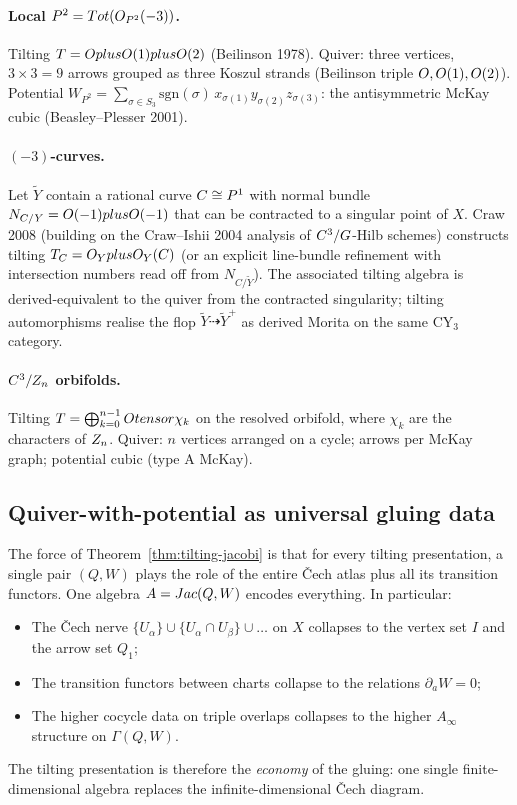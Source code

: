 \paragraph{Local $P^2 = Tot(O_{P^2}(-3))$.} Tilting
$T = O plus O(1) plus O(2)$ (Beilinson 1978). Quiver: three
vertices, $3 \times 3 = 9$ arrows grouped as three Koszul strands (Beilinson
triple $O, O(1), O(2)$). Potential
$W_{P^2} = \sum_{\sigma \in S_3} \mathrm{sgn}(\sigma)\,
x_{\sigma(1)} y_{\sigma(2)} z_{\sigma(3)}$: the antisymmetric McKay cubic
(Beasley--Plesser 2001).

\paragraph{$(-3)$-curves.} Let $\tilde Y$ contain a rational curve $C \cong
P^1$ with normal bundle $N_{C/Y} = O(-1) plus O(-1)$ that can
be contracted to a singular point of $X$. Craw 2008 (building on the
Craw--Ishii 2004 analysis of $C^3/G$-Hilb schemes) constructs tilting
$T_C = O_{Y} plus O_{Y}(C)$ (or an explicit line-bundle
refinement with intersection numbers read off from $N_{C/\tilde Y}$). The
associated tilting algebra is derived-equivalent to the quiver from the
contracted singularity; tilting automorphisms realise the flop $\tilde Y
\dashrightarrow \tilde Y^+$ as derived Morita on the same CY$_3$ category.

\paragraph{$C^3/Z_n$ orbifolds.} Tilting
$T = \bigoplus_{k=0}^{n-1} O tensor \chi_k$ on the resolved orbifold, where
$\chi_k$ are the characters of $Z_n$. Quiver: $n$ vertices arranged on a
cycle; arrows per McKay graph; potential cubic (type A McKay).

\subsection*{Quiver-with-potential as universal gluing data}

The force of Theorem~\ref{thm:tilting-jacobi} is that for every tilting
presentation, a single pair $(Q, W)$ plays the role of the entire \v{C}ech
atlas plus all its transition functors. One algebra $A = Jac(Q, W)$ encodes
everything. In particular:
\begin{itemize}
\item The \v{C}ech nerve $\{U_\alpha\} \cup \{U_\alpha \cap U_\beta\} \cup \ldots$
  on $X$ collapses to the vertex set $I$ and the arrow set $Q_1$;
\item The transition functors between charts collapse to the relations
  $\partial_a W = 0$;
\item The higher cocycle data on triple overlaps collapses to the higher
  $A_\infty$ structure on $\Gamma(Q, W)$.
\end{itemize}
The tilting presentation is therefore the \emph{economy} of the gluing: one
single finite-dimensional algebra replaces the infinite-dimensional \v{C}ech
diagram.

